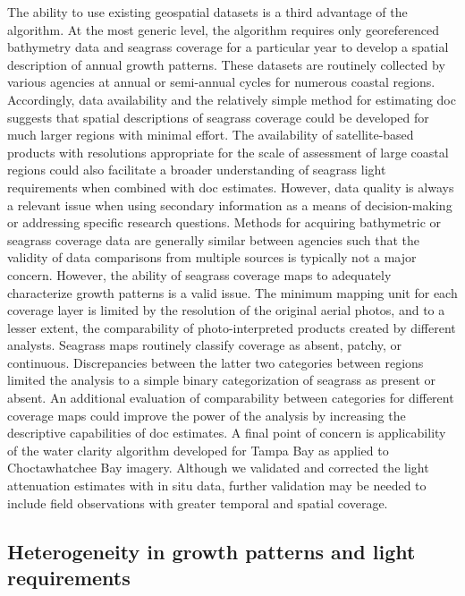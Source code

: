 \documentclass[letterpaper,12pt,oneside]{article}\usepackage[]{graphicx}\usepackage[]{color}
\begin{document}
The ability to use existing geospatial datasets is a third advantage of the algorithm.  At the most generic level, the algorithm requires only georeferenced bathymetry data and seagrass coverage for a particular year to develop a spatial description of annual growth patterns.  These datasets are routinely collected by various agencies at annual or semi-annual cycles for numerous coastal regions.  Accordingly, data availability and the relatively simple method for estimating \ac{doc} suggests that spatial descriptions of seagrass coverage could be developed for much larger regions with minimal effort.  The availability of satellite-based products with resolutions appropriate for the scale of assessment of large coastal regions could also facilitate a broader understanding of seagrass light requirements when combined with \ac{doc} estimates.  However, data quality is always a relevant issue when using secondary information as a means of decision-making or addressing specific research questions.  Methods for acquiring bathymetric or seagrass coverage data are generally similar between agencies such that the validity of data comparisons from multiple sources is typically not a major concern.  However, the ability of seagrass coverage maps to adequately characterize growth patterns is a valid issue.  The minimum mapping unit for each coverage layer is limited by the resolution of the original aerial photos, and to a lesser extent, the comparability of photo-interpreted products created by different analysts.  Seagrass maps routinely classify coverage as absent, patchy, or continuous.  Discrepancies between the latter two categories between regions limited the analysis to a simple binary categorization of seagrass as present or absent. An additional evaluation of comparability between categories for different coverage maps could improve the power of the analysis by increasing the descriptive capabilities of \ac{doc} estimates.  A final point of concern is applicability of the water clarity algorithm developed for Tampa Bay as applied to Choctawhatchee Bay imagery.  Although we validated and corrected the light attenuation estimates with in situ data, further validation may be needed to include field observations with greater temporal and spatial coverage. 

\subsection{Heterogeneity in growth patterns and light requirements}
\end{document}
